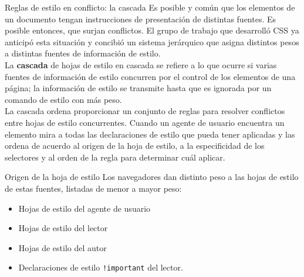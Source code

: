 \begin{frame}{Reglas de estilo en conflicto: la cascada} %
    Es posible y común que los elementos de un documento tengan instrucciones
    de presentación de distintas fuentes. Es posible entonces, que surjan
    conflictos. El grupo de trabajo que desarrolló CSS ya anticipó esta
    situación y concibió un sistema jerárquico que asigna distintos pesos a
    distintas fuentes de información de estilo. \\[0.1cm]

    La \textbf{cascada} de hojas de estilo en cascada se refiere a lo que
    ocurre si varias fuentes de información de estilo concurren por el control
    de los elementos de una página; la información de estilo se transmite hasta
    que es ignorada por un comando de estilo con más peso. \\[0.1cm]

    La cascada ordena proporcionar un conjunto de reglas para resolver
    conflictos entre hojas de estilo concurrentes. Cuando un agente de usuario
    encuentra un elemento mira a todas las declaraciones de estilo que pueda
    tener aplicadas y las ordena de acuerdo al origen de la hoja de estilo, a
    la especificidad de los selectores y al orden de la regla para determinar
    cuál aplicar. 
\end{frame}


\begin{frame}{Origen de la hoja de estilo} %
    Los navegadores dan distinto peso a las hojas de estilo de estas fuentes,
    listadas de menor a mayor peso: 

    \begin{itemize}
        \item Hojas de estilo del agente de usuario
        \item Hojas de estilo del lector
        \item Hojas de estilo del autor
        \item Declaraciones de estilo \texttt{!important} del lector.
    \end{itemize}
\end{frame}


